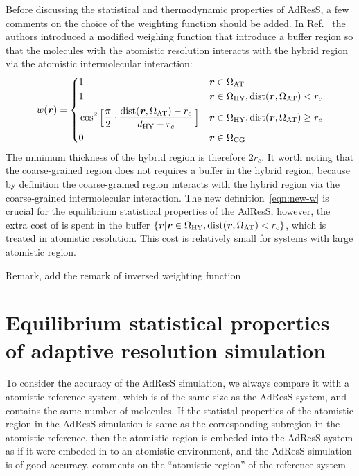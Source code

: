\documentclass[epjST]{svjour}
\newcommand{\recheck}[1]{{\color{red} #1}}
\newcommand{\vect}[1]{\textbf{\textit{#1}}}
\newcommand{\dist}[0]{\textrm {dist}}
\newcommand{\AT}[0]{\textrm{AT}}
\newcommand{\HY}[0]{\textrm{HY}}
\newcommand{\CG}[0]{\textrm{CG}}
\begin{document}
Before discussing the statistical and thermodynamic properties of AdResS, a few comments on the
choice of the weighting function should be added. 
In Ref.~\cite{wang2012adaptive} the authors introduced a modified weighing function that
introduce a buffer region so that the molecules with the atomistic resolution
interacts with the hybrid region via the atomistic intermolecular interaction:
\begin{equation}\label{eqn:new-w}
  w(\vect r) =
  \left\{
    \begin{alignedat}{3}
      &1 &\quad& \vect r \in \Omega_\AT\\
      &1 && \vect r \in\Omega_\HY, \dist(\vect r, \Omega_\AT) < r_c \\
      &\cos^2\Big[\frac{\pi}{2 } \cdot \frac{\dist(\vect r, \Omega_\AT) - r_c}{d_{{\HY}} - r_c}\,\Big] && \vect r \in\Omega_\HY, \dist(\vect r, \Omega_\AT) \geq r_c\\
      &0 &    & \vect r \in \Omega_\CG 
    \end{alignedat}
  \right.
\end{equation}
The minimum thickness of the hybrid region is therefore $2r_c$.
It worth noting that the coarse-grained region does not requires a buffer in the hybrid region, because
by definition the coarse-grained region interacts with the hybrid region via the coarse-grained intermolecular interaction.
The new definition~\eqref{eqn:new-w} is crucial for the equilibrium statistical properties of the AdResS,
however, the extra cost of is spent in the buffer $\{\vect r \vert \vect r \in\Omega_\HY, \dist(\vect r, \Omega_\AT) < r_c\}$,
which is treated in atomistic resolution. This cost is relatively small for systems with large atomistic region.

\recheck{Remark, add the remark of inversed weighting function}

\section{Equilibrium statistical properties of adaptive resolution simulation}
\label{sec:statistical}

To consider the accuracy of the AdResS simulation, we always compare it with a
atomistic reference system, which is of the same size as the AdResS system, and contains the same number of molecules.
If the statistal properties of the atomistic region in the AdResS simulation
is same as the corresponding subregion in the atomistic reference, then
the atomistic region is embeded into the AdResS system as if it were embeded in to
an atomistic environment, and the AdResS simulation is of good accuracy.
\recheck{comments on the ``atomistic region'' of the reference system}
\end{document}

